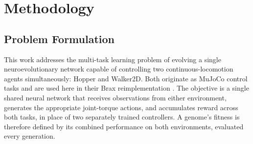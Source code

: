 \documentclass[12pt]{article}
\begin{document}


\section{Methodology}
\label{sec:methodology}

\subsection{Problem Formulation}
\label{subsec:problem-formulation}

This work addresses the multi-task learning problem of evolving a single neuroevolutionary network capable of controlling two continuous-locomotion agents simultaneously: Hopper and Walker2D. Both originate as MuJoCo control tasks \parencite{todorov_mujoco_2012,brockman_openai_2016} and are used here in their Brax reimplementation \parencite{freeman_brax_2021}.
The objective is a single shared neural network that receives observations from either environment, generates the appropriate joint-torque actions, and accumulates reward across both tasks, in place of two separately trained controllers.
A genome's fitness is therefore defined by its combined performance on both environments, evaluated every generation.
\end{document}
